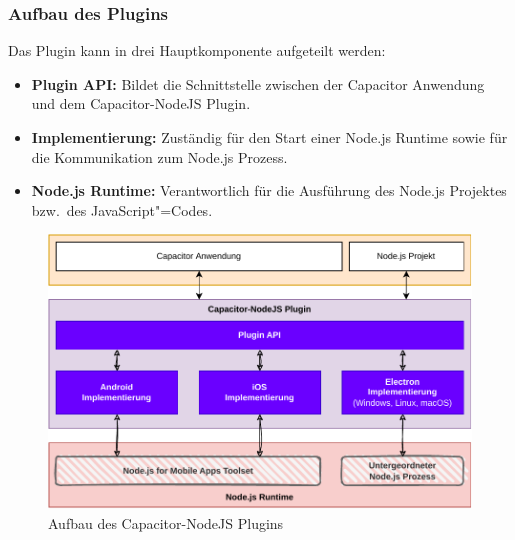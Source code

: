 \subsubsection{Aufbau des Plugins}

Das Plugin kann in drei Hauptkomponente aufgeteilt werden:

\begin{itemize}
    \item \textbf{Plugin API:} Bildet die Schnittstelle zwischen der Capacitor Anwendung und dem Capacitor-NodeJS Plugin.
    \item \textbf{Implementierung:} Zuständig für den Start einer Node.js Runtime sowie für die Kommunikation zum Node.js Prozess.
    \item \textbf{Node.js Runtime:} Verantwortlich für die Ausführung des Node.js Projektes bzw.\ des JavaScript"=Codes.
\end{itemize}

\vfill

\begin{figure}[H]
    \centering
    \includegraphics[width=\textwidth]{assets/02_Capacitor-NodeJS/02_Aufbau.drawio.pdf}
    \caption[Capacitor-NodeJS / Aufbau]{Aufbau des Capacitor-NodeJS Plugins}
\end{figure}

\vfill